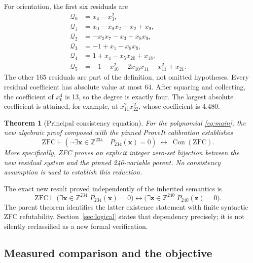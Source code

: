 \documentclass[10pt,letterpaper]{article}
\newtheorem{theorem}{Theorem}[section]
\theoremstyle{definition}\newtheorem{remark}[theorem]{Remark}
\newcommand{\Z}{\mathbb Z}\newcommand{\Q}{\mathbb Q}\newcommand{\N}{\mathbb N}
\newcommand{\Con}{\operatorname{Con}}
\newcommand{\Par}{P_{\mathrm{240}}}
\newcommand{\New}{P_{\mathrm{234}}}
\begin{document}
For orientation, the first six residuals are
\begin{align*}
\mathcal Q_0&=x_4-x_3^2,\\
\mathcal Q_1&=x_0-x_0x_2-x_2+x_9,\\
\mathcal Q_2&=-x_2x_7-x_3+x_8x_9,\\
\mathcal Q_3&=-1+x_1-x_8x_9,\\
\mathcal Q_4&=1+x_4-x_5x_{20}+x_{18},\\
\mathcal Q_5&=-1-x_{10}^2-2x_{10}x_{11}-x_{11}^2+x_{21}.
\end{align*}
The other 165 residuals are part of the definition, not omitted hypotheses.
Every residual coefficient has absolute value at most 64. After squaring
and collecting, the coefficient of $x_0^4$ is 13, so the degree is exactly
four. The largest absolute coefficient is attained, for example, at
$x_{11}^2x_{22}^2$, whose coefficient is 4,480.

\begin{theorem}[Principal consistency equation]\label{thm:main}
For the polynomial \eqref{eq:main}, the new algebraic proof composed with
the pinned ProveIt calibration establishes
\[
 \mathrm{ZFC}\vdash
 \left(\neg\exists\boldsymbol x\in\Z^{234}\quad\New(\boldsymbol x)=0\right)
 \ \longleftrightarrow\ \Con(\mathrm{ZFC}).
\]
More specifically, ZFC proves an explicit integer zero-set bijection
between the new residual system and the pinned 240-variable parent.
No consistency assumption is used to establish this reduction.
\end{theorem}

The exact new result proved independently of the inherited semantics is
\begin{equation}\label{eq:algebra-calibration}
 \mathrm{ZFC}\vdash
 \bigl(\exists\boldsymbol x\in\Z^{234}\;\New(\boldsymbol x)=0\bigr)
 \longleftrightarrow
 \bigl(\exists\boldsymbol z\in\Z^{240}\;\Par(\boldsymbol z)=0\bigr).
\end{equation}
The parent theorem identifies the latter existence statement with finite
syntactic ZFC refutability. Section~\ref{sec:logical} states that dependency
precisely; it is not silently reclassified as a new formal verification.

\subsection{Measured comparison and the objective}
\end{document}
